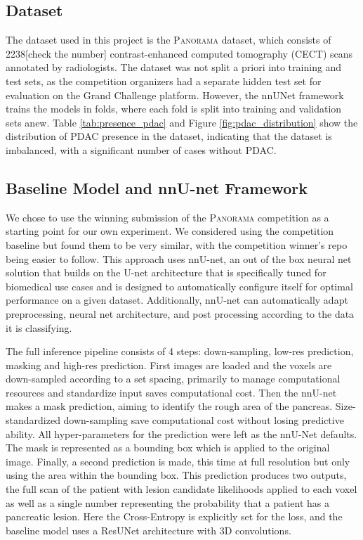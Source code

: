\documentclass[conference]{IEEEtran}
\begin{document}
\subsection{Dataset}
The dataset used in this project is the \textsc{Panorama} dataset, which consists of 2238[check the number] contrast-enhanced computed tomography (CECT) scans annotated by radiologists. The dataset was not split a priori into training and test sets, as the competition organizers had a separate hidden test set for evaluation on the Grand Challenge platform. However, the nnUNet framework trains the models in folds, where each fold is split into training and validation sets anew. Table \ref{tab:presence_pdac} and Figure \ref{fig:pdac_distribution} show the distribution of PDAC presence in the dataset, indicating that the dataset is imbalanced, with a significant number of cases without PDAC.  
\subsection{Baseline Model and nnU-net Framework} 
We chose to use the winning submission of the \textsc{Panorama} competition as a starting point for our own experiment. We considered using the competition baseline but found them to be very similar, with the competition winner's repo being easier to follow. This approach uses nnU-net, \cite{b1} an out of the box neural net solution that builds on the U-net architecture that is specifically tuned for biomedical use cases and is designed to automatically configure itself for optimal performance on a given dataset. Additionally, nnU-net can automatically adapt preprocessing, neural net architecture, and post processing according to the data it is classifying.

The full inference pipeline consists of 4 steps: down-sampling, low-res prediction, masking and high-res prediction. First images are loaded and the voxels are down-sampled according to a set spacing, primarily to manage computational resources and standardize input saves computational cost. Then the nnU-net makes a mask prediction, aiming to identify the rough area of the pancreas. Size-standardized down-sampling save computational cost without losing predictive ability. All hyper-parameters for the prediction were left as the nnU-Net defaults. The mask is represented as a bounding box which is applied to the original image. Finally, a second prediction is made, this time at full resolution but only using the area within the bounding box. This prediction produces two outputs, the full scan of the patient with lesion candidate likelihoods applied to each voxel as well as a single number representing the probability that a patient has a pancreatic lesion. Here the Cross-Entropy is explicitly set for the loss, and the baseline model uses a ResUNet architecture with 3D convolutions.
\end{document}
